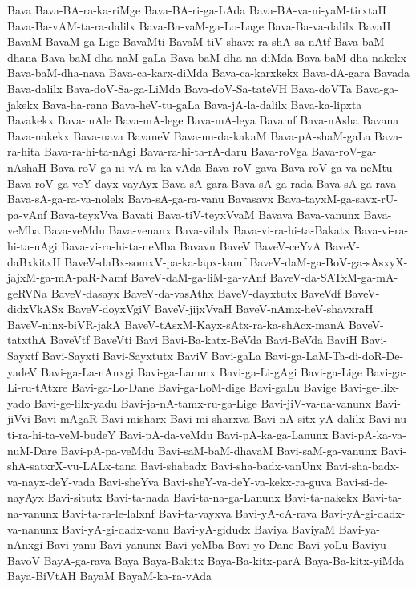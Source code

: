 {Bava
Bava-BA-ra-ka-riMge
Bava-BA-ri-ga-LAda
Bava-BA-va-ni-yaM-tirxtaH
Bava-Ba-vAM-ta-ra-dalilx
Bava-Ba-vaM-ga-Lo-Lage
Bava-Ba-va-dalilx
BavaH
BavaM
BavaM-ga-Lige
BavaMti
BavaM-tiV-shavx-ra-shA-sa-nAtf
Bava-baM-dhana
Bava-baM-dha-naM-gaLa
Bava-baM-dha-na-diMda
Bava-baM-dha-nakekx
Bava-baM-dha-nava
Bava-ca-karx-diMda
Bava-ca-karxkekx
Bava-dA-gara
Bavada
Bava-dalilx
Bava-doV-Sa-ga-LiMda
Bava-doV-Sa-tateVH
Bava-doVTa
Bava-ga-jakekx
Bava-ha-rana
Bava-heV-tu-gaLa
Bava-jA-la-dalilx
Bava-ka-lipxta
Bavakekx
Bava-mAle
Bava-mA-lege
Bava-mA-leya
Bavamf
Bava-nAsha
Bavana
Bava-nakekx
Bava-nava
BavaneV
Bava-nu-da-kakaM
Bava-pA-shaM-gaLa
Bava-ra-hita
Bava-ra-hi-ta-nAgi
Bava-ra-hi-ta-rA-daru
Bava-roVga
Bava-roV-ga-nAshaH
Bava-roV-ga-ni-vA-ra-ka-vAda
Bava-roV-gava
Bava-roV-ga-va-neMtu
Bava-roV-ga-veY-dayx-vayAyx
Bava-sA-gara
Bava-sA-ga-rada
Bava-sA-ga-rava
Bava-sA-ga-ra-va-nolelx
Bava-sA-ga-ra-vanu
Bavasavx
Bava-tayxM-ga-savx-rU-pa-vAnf
Bava-teyxVva
Bavati
Bava-tiV-teyxVvaM
Bavava
Bava-vanunx
Bava-veMba
Bava-veMdu
Bava-venanx
Bava-vilalx
Bava-vi-ra-hi-ta-Bakatx
Bava-vi-ra-hi-ta-nAgi
Bava-vi-ra-hi-ta-neMba
Bavavu
BaveV
BaveV-ceYvA
BaveV-daBxkitxH
BaveV-daBx-somxV-pa-ka-lapx-kamf
BaveV-daM-ga-BoV-ga-sAsxyX-jajxM-ga-mA-paR-Namf
BaveV-daM-ga-liM-ga-vAnf
BaveV-da-SATxM-ga-mA-geRVNa
BaveV-dasayx
BaveV-da-vasAthx
BaveV-dayxtutx
BaveVdf
BaveV-didxVkASx
BaveV-doyxVgiV
BaveV-jijxVvaH
BaveV-nAmx-heV-shavxraH
BaveV-ninx-biVR-jakA
BaveV-tAsxM-Kayx-sAtx-ra-ka-shAcx-manA
BaveV-tatxthA
BaveVtf
BaveVti
Bavi
Bavi-Ba-katx-BeVda
Bavi-BeVda
BaviH
Bavi-Sayxtf
Bavi-Sayxti
Bavi-Sayxtutx
BaviV
Bavi-gaLa
Bavi-ga-LaM-Ta-di-doR-De-yadeV
Bavi-ga-La-nAnxgi
Bavi-ga-Lanunx
Bavi-ga-Li-gAgi
Bavi-ga-Lige
Bavi-ga-Li-ru-tAtxre
Bavi-ga-Lo-Dane
Bavi-ga-LoM-dige
Bavi-gaLu
Bavige
Bavi-ge-lilx-yado
Bavi-ge-lilx-yadu
Bavi-ja-nA-tamx-ru-ga-Lige
Bavi-jiV-va-na-vanunx
Bavi-jiVvi
Bavi-mAgaR
Bavi-misharx
Bavi-mi-sharxva
Bavi-nA-sitx-yA-dalilx
Bavi-nu-ti-ra-hi-ta-veM-budeY
Bavi-pA-da-veMdu
Bavi-pA-ka-ga-Lanunx
Bavi-pA-ka-va-nuM-Dare
Bavi-pA-pa-veMdu
Bavi-saM-baM-dhavaM
Bavi-saM-ga-vanunx
Bavi-shA-satxrX-vu-LALx-tana
Bavi-shabadx
Bavi-sha-badx-vanUnx
Bavi-sha-badx-va-nayx-deY-vada
Bavi-sheYva
Bavi-sheY-va-deY-va-kekx-ra-guva
Bavi-si-de-nayAyx
Bavi-situtx
Bavi-ta-nada
Bavi-ta-na-ga-Lanunx
Bavi-ta-nakekx
Bavi-ta-na-vanunx
Bavi-ta-ra-le-lalxnf
Bavi-ta-vayxva
Bavi-yA-cA-rava
Bavi-yA-gi-dadx-va-nanunx
Bavi-yA-gi-dadx-vanu
Bavi-yA-gidudx
Baviya
BaviyaM
Bavi-ya-nAnxgi
Bavi-yanu
Bavi-yanunx
Bavi-yeMba
Bavi-yo-Dane
Bavi-yoLu
Baviyu
BavoV
BayA-ga-rava
Baya
Baya-Bakitx
Baya-Ba-kitx-parA
Baya-Ba-kitx-yiMda
Baya-BiVtAH
BayaM
BayaM-ka-ra-vAda
}
